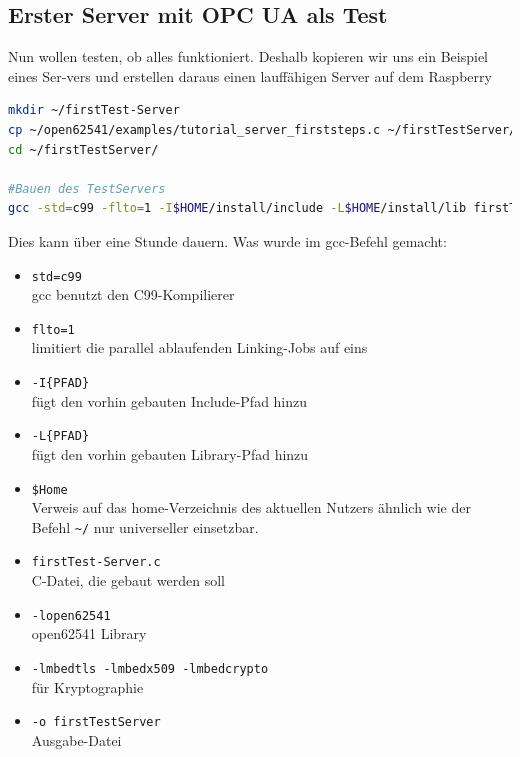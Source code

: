 \subsection{Erster Server mit OPC UA als Test}
Nun wollen testen, ob alles funktioniert. Deshalb kopieren wir uns ein Beispiel eines Ser-vers und erstellen daraus einen lauffähigen Server auf dem Raspberry
\begin{lstlisting}[language=Bash]
mkdir ~/firstTest-Server
cp ~/open62541/examples/tutorial_server_firststeps.c ~/firstTestServer/firstTestServer.c
cd ~/firstTestServer/

#Bauen des TestServers
gcc -std=c99 -flto=1 -I$HOME/install/include -L$HOME/install/lib firstTestServer.c -lopen62541 -lmbedtls -lmbedx509 -lmbedcrypto -o firstTestServer
\end{lstlisting}
Dies kann über eine Stunde dauern.
Was wurde im gcc-Befehl gemacht:
\begin{itemize}
	\item \lstinline|std=c99| \\gcc benutzt den C99-Kompilierer
	\item \lstinline|flto=1| \\limitiert die parallel ablaufenden Linking-Jobs auf eins
	\item \lstinline|-I{PFAD}| \\fügt den vorhin gebauten Include-Pfad hinzu
	\item \lstinline|-L{PFAD}| \\fügt den vorhin gebauten Library-Pfad hinzu
	\item \lstinline|$Home| \\Verweis auf das home-Verzeichnis des aktuellen Nutzers ähnlich wie  der Befehl \lstinline|~/| nur universeller einsetzbar.
	\item \lstinline|firstTest-Server.c|  \\C-Datei, die gebaut werden soll
	\item \lstinline|-lopen62541| \\open62541 Library
	\item \lstinline|-lmbedtls -lmbedx509 -lmbedcrypto| \\für Kryptographie
	\item \lstinline|-o firstTestServer| \\Ausgabe-Datei
\end{itemize}

